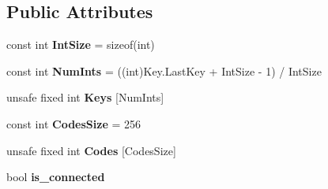 \subsection*{Public Attributes}
\begin{DoxyCompactItemize}
\item 
\hypertarget{struct_open_t_k_1_1_input_1_1_keyboard_state_a8f3281c1b87f17d582cd5d55ad5563e4}{const int {\bfseries Int\-Size} = sizeof(int)}\label{struct_open_t_k_1_1_input_1_1_keyboard_state_a8f3281c1b87f17d582cd5d55ad5563e4}

\item 
\hypertarget{struct_open_t_k_1_1_input_1_1_keyboard_state_a8403012262b0f5e40c65fa8adf509dc0}{const int {\bfseries Num\-Ints} = ((int)Key.\-Last\-Key + Int\-Size -\/ 1) / Int\-Size}\label{struct_open_t_k_1_1_input_1_1_keyboard_state_a8403012262b0f5e40c65fa8adf509dc0}

\item 
\hypertarget{struct_open_t_k_1_1_input_1_1_keyboard_state_a838e223d6b78694e430bc425b2e76417}{unsafe fixed int {\bfseries Keys} \mbox{[}Num\-Ints\mbox{]}}\label{struct_open_t_k_1_1_input_1_1_keyboard_state_a838e223d6b78694e430bc425b2e76417}

\item 
\hypertarget{struct_open_t_k_1_1_input_1_1_keyboard_state_aa7f7f5d209d2a5c86af827ec40d2222b}{const int {\bfseries Codes\-Size} = 256}\label{struct_open_t_k_1_1_input_1_1_keyboard_state_aa7f7f5d209d2a5c86af827ec40d2222b}

\item 
\hypertarget{struct_open_t_k_1_1_input_1_1_keyboard_state_a9b720d00488883dc4d11112929d897ea}{unsafe fixed int {\bfseries Codes} \mbox{[}Codes\-Size\mbox{]}}\label{struct_open_t_k_1_1_input_1_1_keyboard_state_a9b720d00488883dc4d11112929d897ea}

\item 
\hypertarget{struct_open_t_k_1_1_input_1_1_keyboard_state_acbe554e47e47a7c9b877e85bed3dc7e5}{bool {\bfseries is\-\_\-connected}}\label{struct_open_t_k_1_1_input_1_1_keyboard_state_acbe554e47e47a7c9b877e85bed3dc7e5}

\end{DoxyCompactItemize}

